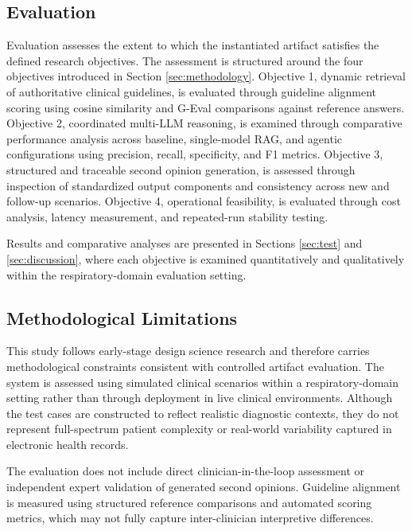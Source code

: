 \documentclass[preprint,12pt]{elsarticle}
\begin{document}
\subsection[]{Evaluation}

Evaluation assesses the extent to which the instantiated artifact satisfies the defined research objectives. The assessment is structured around the four objectives introduced in Section \ref{sec:methodology}. Objective 1, dynamic retrieval of authoritative clinical guidelines, is evaluated through guideline alignment scoring using cosine similarity and G-Eval comparisons against reference answers. Objective 2, coordinated multi-LLM reasoning, is examined through comparative performance analysis across baseline, single-model RAG, and agentic configurations using precision, recall, specificity, and F1 metrics. Objective 3, structured and traceable second opinion generation, is assessed through inspection of standardized output components and consistency across new and follow-up scenarios. Objective 4, operational feasibility, is evaluated through cost analysis, latency measurement, and repeated-run stability testing.

Results and comparative analyses are presented in Sections \ref{sec:test} and \ref{sec:discussion}, where each objective is examined quantitatively and qualitatively within the respiratory-domain evaluation setting.



\subsection[]{Methodological Limitations}

This study follows early-stage design science research and therefore carries methodological constraints consistent with controlled artifact evaluation. The system is assessed using simulated clinical scenarios within a respiratory-domain setting rather than through deployment in live clinical environments. Although the test cases are constructed to reflect realistic diagnostic contexts, they do not represent full-spectrum patient complexity or real-world variability captured in electronic health records.

The evaluation does not include direct clinician-in-the-loop assessment or independent expert validation of generated second opinions. Guideline alignment is measured using structured reference comparisons and automated scoring metrics, which may not fully capture inter-clinician interpretive differences.
\end{document}
